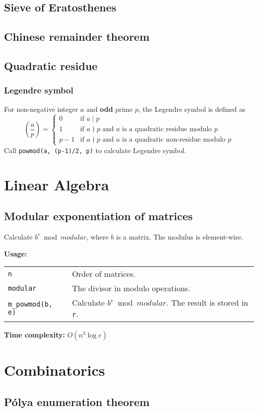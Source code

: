 \subsection{Sieve of Eratosthenes}

\subsection{Chinese remainder theorem}


\subsection{Quadratic residue}
\subsubsection{Legendre symbol}
For non-negative integer $a$ and \textbf{odd} prime $p$, the Legendre symbol is defined as
$$ \left( \frac{a}{p} \right) = \begin{cases} 0 & \text{if } a \mid p  \\ 1 & \text{if } a \nmid p \text{ and } a \text{ is a quadratic residue modulo } p \\ p-1 & \text{if } a \nmid p \text{ and } a \text{ is a quadratic non-residue modulo } p \end{cases} $$
Call \lstinline|powmod(a, (p-1)/2, p)| to calculate Legendre symbol.
\section{Linear Algebra}
\subsection{Modular exponentiation of matrices}
Calculate $b^e \bmod modular$, where $b$ is a matrix. The modulus is element-wise.\par
\textbf{Usage:} \\[0.1cm]
\begin{tabular}{p{3cm} p{8.5cm}}
  \lstinline|n| & Order of matrices. \\
  \lstinline|modular| & The divisor in modulo operations. \\
  \lstinline|m_powmod(b, e)| & Calculate $b^e \bmod modular$. The result is stored in \lstinline|r|. \\
\end{tabular} \par
\textbf{Time complexity:} $O(n^3 \log e)$ \par


\section{Combinatorics}
\subsection{P\'olya enumeration theorem}

